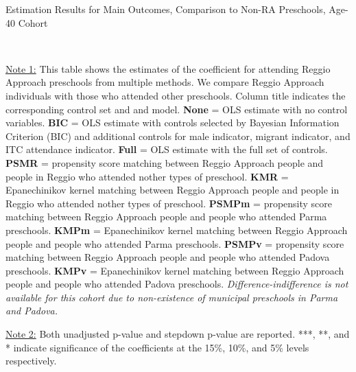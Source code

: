 \begin{table}[H] \caption{Estimation Results for Main Outcomes, Comparison to Non-RA Preschools, Age-40 Cohort} \label{ols-M-adult40-reg-pres}
\scalebox{0.6}{}
\vspace{1ex} \\
\footnotesize\raggedright{\underline{Note 1:} This table shows the estimates of the coefficient for attending Reggio Approach preschools from multiple methods. We compare Reggio Approach individuals with those who attended other preschools. Column title indicates the corresponding control set and and model. \textbf{None} = OLS estimate with no control variables. \textbf{BIC} = OLS estimate with controls selected by Bayesian Information Criterion (BIC) and additional controls for male indicator, migrant indicator, and ITC attendance indicator. \textbf{Full} = OLS estimate with the full set of controls. \textbf{PSMR} =  propensity score matching between Reggio Approach people and people in Reggio who attended nother types of preschool. \textbf{KMR} = Epanechinikov kernel matching between Reggio Approach people and people in Reggio who attended nother types of preschool. \textbf{PSMPm} = propensity score matching between Reggio Approach people and people who attended Parma preschools. \textbf{KMPm} = Epanechinikov kernel matching between Reggio Approach people and people who attended Parma preschools. \textbf{PSMPv} = propensity score matching between Reggio Approach people and people who attended Padova preschools. \textbf{KMPv} = Epanechinikov kernel matching between Reggio Approach people and people who attended Padova preschools. \textit{Difference-indifference is not available for this cohort due to non-existence of municipal preschools in Parma and Padova.}}

\footnotesize\raggedright{\underline{Note 2:} Both unadjusted p-value and stepdown p-value are reported. ***, **, and * indicate significance of the coefficients at the 15\%, 10\%, and 5\% levels respectively.}
\end{table}

